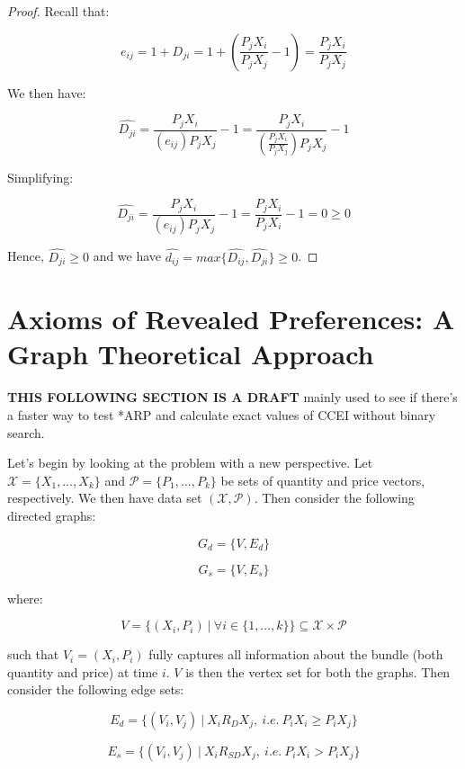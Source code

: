 \documentclass{article} %
\begin{document}
\begin{proof}
Recall that:

$$e_{ij}=1+D_{ji}=1+ \left (\frac{P_jX_i}{P_jX_j}-1 \right )=\frac{P_jX_i}{P_jX_j}$$

We then have:

$$\hat{D_{ji}}=\frac{P_jX_i}{(e_{ij})P_jX_j}-1=\frac{P_jX_i}{(\frac{P_jX_i}{P_jX_j})P_jX_j}-1$$

Simplifying:

$$\hat{D_{ji}}=\frac{P_jX_i}{(e_{ij})P_jX_j}-1=\frac{P_jX_i}{P_jX_i}-1=0\geq0$$

Hence, $\hat{D_{ji}}\geq0$ and we have $\hat{d_{ij}}=max\{\hat{D_{ij}},\hat{D_{ji}}\}\geq0$.

\end{proof}

\newpage

\section{Axioms of Revealed Preferences: A Graph Theoretical Approach}

\textbf{THIS FOLLOWING SECTION IS A DRAFT} mainly used to see if there's a faster way to test *ARP and calculate exact values of CCEI without binary search.


Let's begin by looking at the problem with a new perspective. Let $\mathcal{X}=\{X_1,\ldots,X_k\}$ and $\mathcal{P}=\{P_1,\ldots,P_k\}$ be sets of quantity and price vectors, respectively. We then have data set $(\mathcal{X},\mathcal{P})$. Then consider the following directed graphs:


\begin{minipage}{.5\linewidth}
$$G_d=\{V,E_d\}$$
\end{minipage}%
\begin{minipage}{.5\linewidth}
$$G_s=\{V,E_s\}$$
\end{minipage}


where:

$$V=\{(X_i,P_i)\ |\ \forall i\in\{1,\ldots,k\}\}\subseteq \mathcal{X}\times\mathcal{P}$$


such that $V_{i}=(X_i,P_i)$ fully captures all information about the bundle (both quantity and price) at time $i$. $V$ is then the vertex set for both the graphs. Then consider the following edge sets:

$$E_d=\{(V_i,V_j)\ |\ X_i R_D X_j,\ i.e.\ P_iX_i\geq P_iX_j\}$$

$$E_s=\{(V_i,V_j)\ |\ X_i R_{SD} X_j,\ i.e.\ P_iX_i> P_iX_j\}$$
\end{document}
